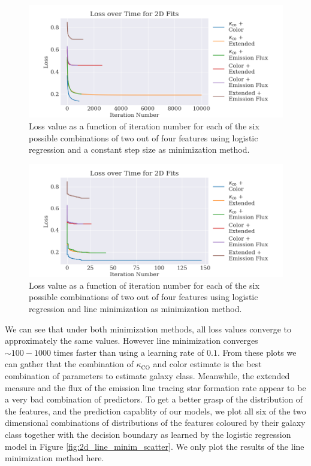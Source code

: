 \begin{figure}
    \centering
    \includegraphics[width=\textwidth]{results/2d_fit_losses_constant_step.png}
    \caption{Loss value as a function of iteration number for each of the six possible combinations of two out of four features using logistic regression and a constant step size as minimization method.}
    \label{fig:losscurve_stepsize}
\end{figure}

\begin{figure}
    \centering
    \includegraphics[width=\textwidth]{results/2d_fit_losses_line_minim.png}
    \caption{Loss value as a function of iteration number for each of the six possible combinations of two out of four features using logistic regression and line minimization as minimization method.}
    \label{fig:losscurve_linemini}
\end{figure}

We can see that under both minimization methods, all loss values converge to approximately the same values. However line minimization converges $\sim 100 - 1000$ times faster than using a learning rate of $0.1$. From these plots we can gather that the combination of $\kappa_{\mathrm{CO}}$ and color estimate is the best combination of parameters to estimate galaxy class. Meanwhile, the extended measure and the flux of the emission line tracing star formation rate appear to be a very bad combination of predictors. To get a better grasp of the distribution of the features, and the prediction capablity of our models, we plot all six of the two dimensional combinations of distributions of the features coloured by their galaxy class together with the decision boundary as learned by the logistic regression model in Figure \ref{fig:2d_line_minim_scatter}. We only plot the results of the line minimization method here.


